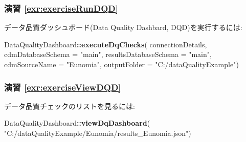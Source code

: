 \documentclass[
  11pt]{book}
\newenvironment{Shaded}{\begin{snugshade}}{\end{snugshade}}
\newcommand{\AttributeTok}[1]{\textcolor[rgb]{0.13,0.29,0.53}{#1}}
\newcommand{\FunctionTok}[1]{\textcolor[rgb]{0.13,0.29,0.53}{\textbf{#1}}}
\newcommand{\NormalTok}[1]{#1}
\newcommand{\SpecialCharTok}[1]{\textcolor[rgb]{0.81,0.36,0.00}{\textbf{#1}}}
\newcommand{\StringTok}[1]{\textcolor[rgb]{0.31,0.60,0.02}{#1}}
\theoremstyle{definition}
\theoremstyle{definition}
\theoremstyle{definition}
\theoremstyle{definition}
\theoremstyle{remark}
\begin{document}
\subsubsection*{演習 \ref{exr:exerciseRunDQD}}\label{ux6f14ux7fd2-refexrexerciserundqd}

データ品質ダッシュボード(Data Quality Dashbard, DQD)を実行するには:

\begin{Shaded}
\begin{Highlighting}[]
\NormalTok{DataQualityDashboard}\SpecialCharTok{::}\FunctionTok{executeDqChecks}\NormalTok{(}
\NormalTok{  connectionDetails,}
  \AttributeTok{cdmDatabaseSchema =} \StringTok{"main"}\NormalTok{,}
  \AttributeTok{resultsDatabaseSchema =} \StringTok{"main"}\NormalTok{,}
  \AttributeTok{cdmSourceName =} \StringTok{"Eunomia"}\NormalTok{,}
  \AttributeTok{outputFolder =} \StringTok{"C:/dataQualityExample"}\NormalTok{)}
\end{Highlighting}
\end{Shaded}

\subsubsection*{演習 \ref{exr:exerciseViewDQD}}\label{ux6f14ux7fd2-refexrexerciseviewdqd}

データ品質チェックのリストを見るには:

\begin{Shaded}
\begin{Highlighting}[]
\NormalTok{DataQualityDashboard}\SpecialCharTok{::}\FunctionTok{viewDqDashboard}\NormalTok{(}
  \StringTok{"C:/dataQualityExample/Eunomia/results\_Eunomia.json"}\NormalTok{)}
\end{Highlighting}
\end{Shaded}

\section{}\label{section}

  

\backmatter
\printindex
\end{document}
